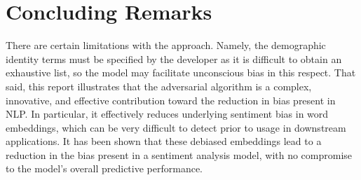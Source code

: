 \documentclass[a4paper]{IEEEtran}
\begin{document}
\section{Concluding Remarks}
There are certain limitations with the approach. Namely, the demographic identity terms must be specified by the developer as it is difficult to obtain an exhaustive list, so the model may facilitate unconscious bias in this respect. That said, this report illustrates that the adversarial algorithm is a complex, innovative, and effective contribution toward the reduction in bias present in NLP. In particular, it effectively reduces underlying sentiment bias in word embeddings, which can be very difficult to detect prior to usage in downstream applications. It has been shown that these debiased embeddings lead to a reduction in the bias present in a sentiment analysis model, with no compromise to the model's overall predictive performance.




\end{document}
